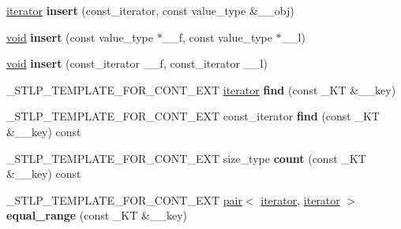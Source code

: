\begin{DoxyCompactItemize}
\item 
\mbox{\label{classunordered__multiset_acf78025820aa2695028286db641e3031}} 
\hyperlink{structiterator}{iterator} {\bfseries insert} (const\+\_\+iterator, const value\+\_\+type \&\+\_\+\+\_\+obj)
\item 
\mbox{\label{classunordered__multiset_ad5356c000eff9d846de40f7748cd4214}} 
\hyperlink{interfacevoid}{void} {\bfseries insert} (const value\+\_\+type $\ast$\+\_\+\+\_\+f, const value\+\_\+type $\ast$\+\_\+\+\_\+l)
\item 
\mbox{\label{classunordered__multiset_a91e8cbd00dbac2467af990b3fd02debd}} 
\hyperlink{interfacevoid}{void} {\bfseries insert} (const\+\_\+iterator \+\_\+\+\_\+f, const\+\_\+iterator \+\_\+\+\_\+l)
\item 
\mbox{\label{classunordered__multiset_a3bd5f28fdc51f48aaef1c75d17422479}} 
\+\_\+\+S\+T\+L\+P\+\_\+\+T\+E\+M\+P\+L\+A\+T\+E\+\_\+\+F\+O\+R\+\_\+\+C\+O\+N\+T\+\_\+\+E\+XT \hyperlink{structiterator}{iterator} {\bfseries find} (const \+\_\+\+KT \&\+\_\+\+\_\+key)
\item 
\mbox{\label{classunordered__multiset_a4236b6b7fa7ffd67831184889e35ee89}} 
\+\_\+\+S\+T\+L\+P\+\_\+\+T\+E\+M\+P\+L\+A\+T\+E\+\_\+\+F\+O\+R\+\_\+\+C\+O\+N\+T\+\_\+\+E\+XT const\+\_\+iterator {\bfseries find} (const \+\_\+\+KT \&\+\_\+\+\_\+key) const
\item 
\mbox{\label{classunordered__multiset_a5a21ac6783d2bce014db2b31693259a7}} 
\+\_\+\+S\+T\+L\+P\+\_\+\+T\+E\+M\+P\+L\+A\+T\+E\+\_\+\+F\+O\+R\+\_\+\+C\+O\+N\+T\+\_\+\+E\+XT size\+\_\+type {\bfseries count} (const \+\_\+\+KT \&\+\_\+\+\_\+key) const
\item 
\mbox{\label{classunordered__multiset_a26f30974aad8d28c81f3b296bc4a0e0c}} 
\+\_\+\+S\+T\+L\+P\+\_\+\+T\+E\+M\+P\+L\+A\+T\+E\+\_\+\+F\+O\+R\+\_\+\+C\+O\+N\+T\+\_\+\+E\+XT \hyperlink{structpair}{pair}$<$ \hyperlink{structiterator}{iterator}, \hyperlink{structiterator}{iterator} $>$ {\bfseries equal\+\_\+range} (const \+\_\+\+KT \&\+\_\+\+\_\+key)
\item 
\mbox{\label{classunordered__multiset_a99f70434e7cf27217227de03d209c761}} 

\end{DoxyCompactItemize}
